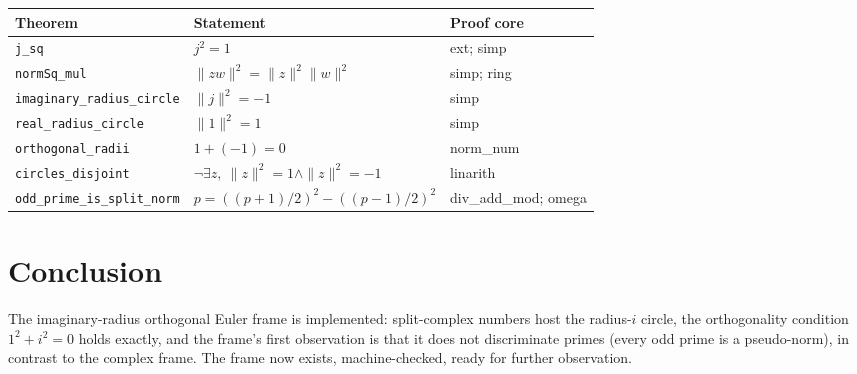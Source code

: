 \documentclass[sigplan,10pt,anonymous,review]{acmart}
\begin{document}
\begin{center}
\begin{tabular}{lll}
\toprule
Theorem & Statement & Proof core \\
\midrule
\texttt{j\_sq} & $j^2 = 1$ & ext; simp \\
\texttt{normSq\_mul} & $\|zw\|^2 = \|z\|^2\|w\|^2$ & simp; ring \\
\texttt{imaginary\_radius\_circle} & $\|j\|^2 = -1$ & simp \\
\texttt{real\_radius\_circle} & $\|1\|^2 = 1$ & simp \\
\texttt{orthogonal\_radii} & $1 + (-1) = 0$ & norm\_num \\
\texttt{circles\_disjoint} & $\neg\exists z,\ \|z\|^2 = 1 \wedge \|z\|^2 = -1$ & linarith \\
\texttt{odd\_prime\_is\_split\_norm} & $p = ((p{+}1)/2)^2 - ((p{-}1)/2)^2$ & div\_add\_mod; omega \\
\bottomrule
\end{tabular}
\end{center}

\section{Conclusion}

The imaginary-radius orthogonal Euler frame is implemented: split-complex
numbers host the radius-$i$ circle, the orthogonality condition
$1^2 + i^2 = 0$ holds exactly, and the frame's first observation is that
it does not discriminate primes (every odd prime is a pseudo-norm),
in contrast to the complex frame. The frame now exists, machine-checked,
ready for further observation.



\end{document}
